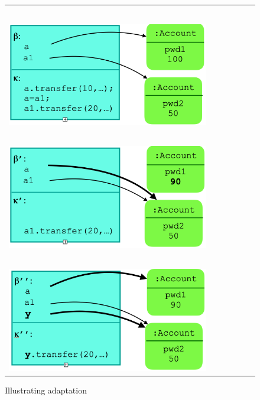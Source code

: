 \begin{figure}[htbp]
\begin{tabular}{clclc}
 \begin{minipage}{0.27\textwidth}
 $\sigma:$\\
 ~ \\
 \includegraphics[width=\linewidth]{diagrams/adapt1.png}
   \end{minipage}
 & \ \ \ &
 \begin{minipage}{0.27\textwidth}
  $\sigma':$\\
  ~ \ \\
  \includegraphics[width=\linewidth]{diagrams/adapt2.png}
   \end{minipage}
   & \ \ \  &
    \begin{minipage}{0.27\textwidth}
$\adapt {\sigma'}{\sigma}:$\\
~ \\
  \includegraphics[width=\linewidth]{diagrams/adapt3.png}
   \end{minipage}
\end{tabular}
\caption{Illustrating adaptation
}
\label{fig:Adaptation}
\end{figure}


